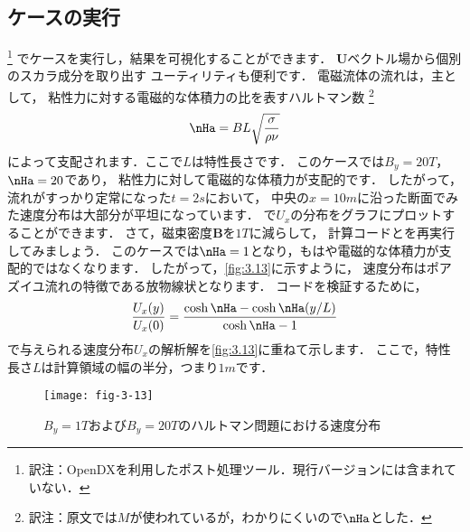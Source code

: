 \subsection{ケースの実行}
\label{ssec:3.5.3}
%
\footnote{訳注：OpenDXを利用したポスト処理ツール．現行バージョンには含まれていない．}%
でケースを実行し，結果を可視化することができます．
$\bm{U}$ベクトル場から個別のスカラ成分を取り出す
ユーティリティも便利です．
電磁流体の流れは，主として，
粘性力に対する電磁的な体積力の比を表すハルトマン数%
\footnote{訳注：原文では$M$が使われているが，わかりにくいので$\nHa$とした．}%
\begin{align}
 \label{eq:3.28}
 \nHa = BL\sqrt{\frac{\sigma}{\rho\nu}}
\end{align}
によって支配されます．ここで$L$は特性長さです．
このケースでは$B_{y} = 20 \unit{T}$，$\nHa = 20$であり，
粘性力に対して電磁的な体積力が支配的です．
したがって，流れがすっかり定常になった$t = 2 \unit{s}$において，
中央の$x = 10 \unit{m}$に沿った断面でみた速度分布は大部分が平坦になっています．
で$U_{x}$の分布をグラフにプロットすることができます．
さて，磁束密度$\bm{B}$を$1 \unit{T}$に減らして，
計算コードとを再実行してみましょう．
このケースでは$\nHa = 1$となり，もはや電磁的な体積力が支配的ではなくなります．
したがって，\autoref{fig:3.13}に示すように，
速度分布はポアズイユ流れの特徴である放物線状となります．
コードを検証するために，
\begin{align}
 \label{eq:3.29}
 \frac{U_{x}(y)}{U_{x}(0)}
 = \frac{\cosh\nHa - \cosh\nHa (y/L)}{\cosh\nHa - 1}
\end{align}
で与えられる速度分布$U_{x}$の解析解を\autoref{fig:3.13}に重ねて示します．
ここで，特性長さ$L$は計算領域の幅の半分，つまり$1 \unit{m}$です．


\begin{figure}[ht]
 \texttt{[image: fig-3-13]}
 \caption{$B_{y} = 1 \unit{T}$および$B_{y} = 20 \unit{T}$のハルトマン問題における速度分布}
 \label{fig:3.13}
\end{figure}

